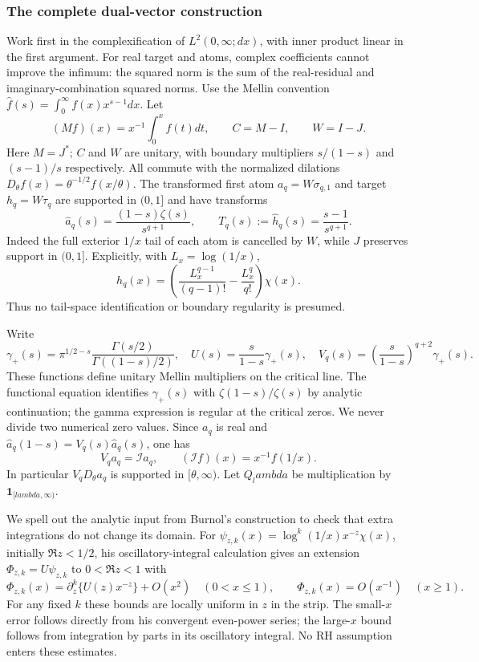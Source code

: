 \documentclass[11pt]{article}
\def\lambda{lambda}%
\theoremstyle{remark}
\begin{document}
\subsubsection{The complete dual-vector construction}
Work first in the complexification of $L^2(0,\infty;dx)$, with inner
product linear in the first argument. For real target and atoms,
complex coefficients cannot improve the infimum: the squared norm is
the sum of the real-residual and imaginary-combination squared norms.
Use the Mellin convention $\widehat f(s)=\int_0^\infty f(x)x^{s-1}dx$.
Let
\[
 (Mf)(x)=x^{-1}\int_0^x f(t)dt,\qquad C=M-I,\qquad W=I-J.
\]
Here $M=J^*$; $C$ and $W$ are unitary, with boundary multipliers
$s/(1-s)$ and $(s-1)/s$ respectively. All commute with the normalized
dilations $D_\theta f(x)=\theta^{-1/2}f(x/\theta)$.
The transformed first atom $a_q=W\sigma_{q,1}$ and target $h_q=W\tau_q$
are supported in $(0,1]$ and have transforms
\begin{equation}
 \widehat a_q(s)=\frac{(1-s)\zeta(s)}{s^{q+1}},\qquad
 T_q(s):=\widehat h_q(s)=\frac{s-1}{s^{q+1}}.
 \label{eq:ns83-transforms}
\end{equation}
Indeed the full exterior $1/x$ tail of each atom is cancelled by $W$,
while $J$ preserves support in $(0,1]$. Explicitly, with $L_x=\log(1/x)$,
\[
 h_q(x)=\left(\frac{L_x^{q-1}}{(q-1)!}
             -\frac{L_x^q}{q!}\right)\chi(x).
\]
Thus no tail-space identification or boundary regularity is presumed.

Write
\[
 \gamma_+(s)=\pi^{1/2-s}\frac{\Gamma(s/2)}{\Gamma((1-s)/2)},
 \quad U(s)=\frac{s}{1-s}\gamma_+(s),
 \quad V_q(s)=\left(\frac{s}{1-s}\right)^{q+2}\gamma_+(s).
\]
These functions define unitary Mellin multipliers on the critical line.
The functional equation identifies $\gamma_+(s)$ with
$\zeta(1-s)/\zeta(s)$ by analytic continuation; the gamma expression is
regular at the critical zeros. We never divide two numerical zero values.
Since $a_q$ is real and
$\widehat a_q(1-s)=V_q(s)\widehat a_q(s)$, one has
\[
 V_q a_q=\mathcal I a_q,\qquad
 (\mathcal I f)(x)=x^{-1}f(1/x).
\]
In particular $V_qD_\theta a_q$ is supported in $[\theta,\infty)$.
Let $Q_\lambda$ be multiplication by $\mathbf1_{[\lambda,\infty)}$.

We spell out the analytic input from Burnol's construction to check that
extra integrations do not change its domain. For
$\psi_{z,k}(x)=\log^k(1/x)x^{-z}\chi(x)$, initially $\Re z<1/2$,
his oscillatory-integral calculation
\cite[Section 4, especially the expansion preceding Theorem 4.11]{BurnolLower2002}
gives an extension $\Phi_{z,k}=U\psi_{z,k}$ to $0<\Re z<1$ with
\[
 \Phi_{z,k}(x)=\partial_z^k\{U(z)x^{-z}\}+O(x^2)
                   \quad(0<x\leq1),\qquad
 \Phi_{z,k}(x)=O(x^{-1})\quad(x\geq1).
\]
For any fixed $k$ these bounds are locally uniform in $z$ in the strip.
The small-$x$ error follows directly from his convergent even-power
series; the large-$x$ bound follows from integration by parts in its
oscillatory integral. No RH assumption enters these estimates.
\end{document}
